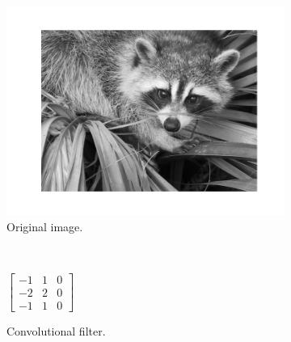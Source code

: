         \begin{figure}
            \centering
            \begin{subfigure}[t]{0.3\textwidth}
                \centering
                \includegraphics[width=\textwidth]{images/face.png}
                \caption{Original image.}
                \label{fig:convolution-face-original}
            \end{subfigure}%
            ~
            \begin{subfigure}[t]{0.3\textwidth}
                \centering
                \begin{minipage}{\textwidth}
                \vspace{-75pt}
                \centering
                $
                    \begin{bmatrix}
                        -1 & 1 & 0 \\
                        -2 & 2 & 0 \\
                        -1 & 1 & 0
                    \end{bmatrix}
                $
                \end{minipage}
                \caption{Convolutional filter.}
                \label{fig:convolution-face-filter}
            \end{subfigure}%
            ~
            \begin{subfigure}[t]{0.3\textwidth}
                \centering

\end{subfigure}
\end{figure}
